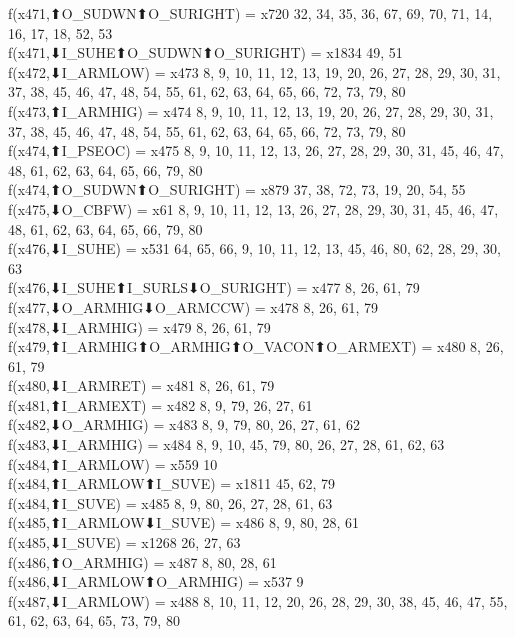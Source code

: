 f(x471,⬆O_SUDWN⬆O_SURIGHT) = x720 {32, 34, 35, 36, 67, 69, 70, 71, 14, 16, 17, 18, 52, 53} \\
f(x471,⬇I_SUHE⬆O_SUDWN⬆O_SURIGHT) = x1834 {49, 51} \\
f(x472,⬇I_ARMLOW) = x473 {8, 9, 10, 11, 12, 13, 19, 20, 26, 27, 28, 29, 30, 31, 37, 38, 45, 46, 47, 48, 54, 55, 61, 62, 63, 64, 65, 66, 72, 73, 79, 80} \\
f(x473,⬆I_ARMHIG) = x474 {8, 9, 10, 11, 12, 13, 19, 20, 26, 27, 28, 29, 30, 31, 37, 38, 45, 46, 47, 48, 54, 55, 61, 62, 63, 64, 65, 66, 72, 73, 79, 80} \\
f(x474,⬆I_PSEOC) = x475 {8, 9, 10, 11, 12, 13, 26, 27, 28, 29, 30, 31, 45, 46, 47, 48, 61, 62, 63, 64, 65, 66, 79, 80} \\
f(x474,⬆O_SUDWN⬆O_SURIGHT) = x879 {37, 38, 72, 73, 19, 20, 54, 55} \\
f(x475,⬇O_CBFW) = x61 {8, 9, 10, 11, 12, 13, 26, 27, 28, 29, 30, 31, 45, 46, 47, 48, 61, 62, 63, 64, 65, 66, 79, 80} \\
f(x476,⬇I_SUHE) = x531 {64, 65, 66, 9, 10, 11, 12, 13, 45, 46, 80, 62, 28, 29, 30, 63} \\
f(x476,⬇I_SUHE⬆I_SURLS⬇O_SURIGHT) = x477 {8, 26, 61, 79} \\
f(x477,⬇O_ARMHIG⬇O_ARMCCW) = x478 {8, 26, 61, 79} \\
f(x478,⬇I_ARMHIG) = x479 {8, 26, 61, 79} \\
f(x479,⬆I_ARMHIG⬆O_ARMHIG⬆O_VACON⬆O_ARMEXT) = x480 {8, 26, 61, 79} \\
f(x480,⬇I_ARMRET) = x481 {8, 26, 61, 79} \\
f(x481,⬆I_ARMEXT) = x482 {8, 9, 79, 26, 27, 61} \\
f(x482,⬇O_ARMHIG) = x483 {8, 9, 79, 80, 26, 27, 61, 62} \\
f(x483,⬇I_ARMHIG) = x484 {8, 9, 10, 45, 79, 80, 26, 27, 28, 61, 62, 63} \\
f(x484,⬆I_ARMLOW) = x559 {10} \\
f(x484,⬆I_ARMLOW⬆I_SUVE) = x1811 {45, 62, 79} \\
f(x484,⬆I_SUVE) = x485 {8, 9, 80, 26, 27, 28, 61, 63} \\
f(x485,⬆I_ARMLOW⬇I_SUVE) = x486 {8, 9, 80, 28, 61} \\
f(x485,⬇I_SUVE) = x1268 {26, 27, 63} \\
f(x486,⬆O_ARMHIG) = x487 {8, 80, 28, 61} \\
f(x486,⬇I_ARMLOW⬆O_ARMHIG) = x537 {9} \\
f(x487,⬇I_ARMLOW) = x488 {8, 10, 11, 12, 20, 26, 28, 29, 30, 38, 45, 46, 47, 55, 61, 62, 63, 64, 65, 73, 79, 80} \\
